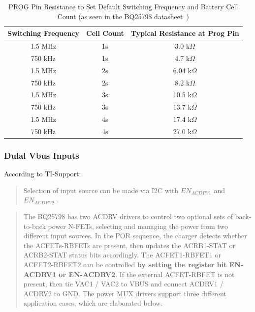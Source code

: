 \documentclass[12pt]{article}
\begin{document}
\begin{table}[H]
    \centering
    \begin{tabular}{|c|c|c|}
        \hline
        \rowcolor{headerbg}
        \textcolor{headerfg}{\textbf{Switching Frequency}} & 
        \textcolor{headerfg}{\textbf{Cell Count}} & 
        \textcolor{headerfg}{\textbf{Typical Resistance at Prog Pin}} \\
        \hline
        1.5 MHz & 1s & 3.0 k$\Omega$ \\
        750 kHz & 1s & 4.7 k$\Omega$ \\
        1.5 MHz & 2s & 6.04 k$\Omega$ \\
        750 kHz & 2s & 8.2 k$\Omega$ \\
        1.5 MHz & 3s & 10.5 k$\Omega$ \\
        750 kHz & 3s & 13.7 k$\Omega$ \\
        1.5 MHz & 4s & 17.4 k$\Omega$ \\
        750 kHz & 4s & 27.0 k$\Omega$ \\
        \hline
    \end{tabular}
    \caption{PROG Pin Resistance to Set Default Switching Frequency and Battery Cell Count (as seen in the BQ25798 datasheet~\cite[p.~46]{TI_BQ25798})}
    \label{tab:frequency_resistance}
\end{table}

\subsubsection{Dulal Vbus Inputs}
According to TI-Support:
\begin{quote}
    Selection of input source can be made via I2C with \(EN_{ACDRV1}\) and \(EN_{ACDRV2}\) \cite{ti_bq25672_dual_input}.
\end{quote}
\begin{quote}
    The BQ25798 has two ACDRV drivers to control two optional sets of back-to-back power N-FETs, selecting
    and managing the power from two different input sources. In the POR sequence, the charger detects whether
    the ACFETs-RBFETs are present, then updates the ACRB1-STAT or ACRB2-STAT status bits accordingly.
    The ACFET1-RBFET1 or ACFET2-RBFET2 can be controlled \textbf{by setting the register bit EN-ACDRV1 or
    EN-ACDRV2}. If the external ACFET-RBFET is not present, then tie VAC1 / VAC2 to VBUS and connect
    ACDRV1 / ACDRV2 to GND. The power MUX drivers support three different application cases, which are
    elaborated below. \cite{TI_BQ25798}
\end{quote}
\end{document}

